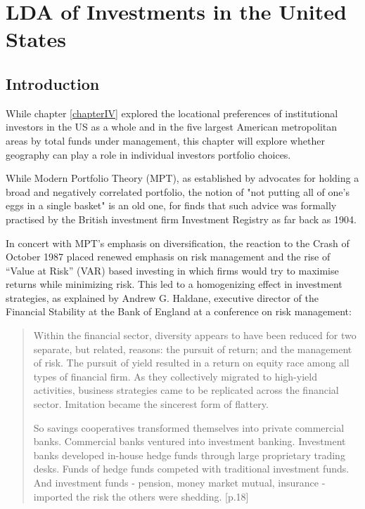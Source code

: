 \chapter{LDA of Investments in the United States} 
\section{Introduction}
\nocite{tmpackage} \nocite{LDAvis} \nocite{Stargazer}

While chapter \ref{chapterIV} explored the locational preferences of institutional investors in the US as a whole and in the five largest American metropolitan areas by total funds under management, this chapter will explore whether geography can play a role in individual investors portfolio choices.   

While Modern Portfolio Theory (MPT), as established by \cite{Markowitz1952} advocates for holding a broad and negatively correlated portfolio, the notion of "not putting all of one's eggs in a single basket" is an old one, for \cite{Lofthouse53} finds that such advice was formally practised by the British investment firm Investment Registry as far back as 1904.  

In concert with MPT's emphasis on diversification, the reaction to the Crash of October 1987 placed renewed emphasis on risk management and the rise of ``Value at Risk'' (VAR) based investing in which firms would try to maximise returns while minimizing risk.  This led to a homogenizing effect in investment strategies, as explained by Andrew G. Haldane, executive director of the Financial Stability at the Bank of England at a conference on risk management:

\begin{quote}
	Within the financial sector, diversity appears to have been reduced for two separate, but related, reasons:  the pursuit of return;  and the management of risk.  The pursuit of yield resulted in a return on equity race among all types of financial firm.  As they collectively migrated to high-yield activities, business strategies came to be replicated across the financial sector.  Imitation became the sincerest form of flattery.
	
	So savings cooperatives transformed themselves into private commercial banks.  Commercial banks ventured into investment banking.  Investment banks developed in-house hedge funds through large proprietary trading desks.  Funds of hedge funds competed with traditional investment funds.  And investment funds - pension, money market mutual, insurance - imported the risk the others were shedding.   \citep{Haldane2009}[p.18]
\end{quote} 

